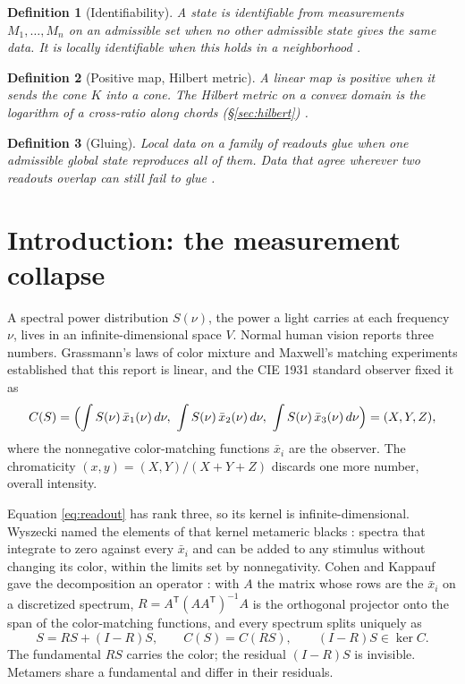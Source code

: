 \documentclass[11pt]{article}
\theoremstyle{boldplain}
\theoremstyle{boldupright}
\newtheorem{definition}{Definition}
\begin{document}
\begin{definition}[Identifiability]
A state is identifiable from measurements $M_1,\dots,M_n$ on an admissible set when no other admissible state gives the same data. It is locally identifiable when this
holds in a neighborhood \cite{rothenberg1971}.
\end{definition}

\begin{definition}[Positive map, Hilbert metric]
A linear map is positive when it sends the cone $K$
into a cone. The Hilbert metric on a convex domain is the logarithm of a cross-ratio along chords
(\S\ref{sec:hilbert}) \cite{hilbert1895}.
\end{definition}

\begin{definition}[Gluing]\label{def:glue}
Local data on a family of readouts glue when one admissible global state reproduces all of them.
Data that agree wherever two readouts overlap can still fail to glue \cite{abramsky2011}.
\end{definition}

\section{Introduction: the measurement collapse}\label{sec:intro}

A spectral power distribution $S(\nu)$, the power a light carries at each frequency $\nu$, lives in an
infinite-dimensional space $V$. Normal human vision reports three numbers. Grassmann's laws of
color mixture \cite{grassmann1853} and Maxwell's matching experiments \cite{maxwell1860} established that this report is linear, and
the CIE 1931 standard observer \cite{smith1931} fixed it as
\begin{equation}\label{eq:readout}
C(S)=\Bigl(\int S(\nu)\,\bar x_1(\nu)\,d\nu,\ \int S(\nu)\,\bar x_2(\nu)\,d\nu,\ \int S(\nu)\,\bar x_3(\nu)\,d\nu\Bigr)=(X,Y,Z),
\end{equation}
where the nonnegative color-matching functions $\bar x_i$ are the observer. The chromaticity $(x,y)=
(X,Y)/(X+Y+Z)$ discards one more number, overall intensity.

Equation \eqref{eq:readout} has rank three, so its kernel is infinite-dimensional. Wyszecki named the elements
of that kernel metameric blacks \cite{wyszecki1958}: spectra that integrate to zero against every $\bar x_i$ and can be
added to any stimulus without changing its color, within the limits set by nonnegativity. Cohen
and Kappauf gave the decomposition an operator \cite{cohen1982}: with $A$ the matrix whose rows are the $\bar x_i$
on a discretized spectrum, $R=A^{\mathsf T}(AA^{\mathsf T})^{-1}A$ is the orthogonal projector onto the span of the
color-matching functions, and every spectrum splits uniquely as
\begin{equation}\label{eq:cohen}
S=RS+(I-R)S,\qquad C(S)=C(RS),\qquad (I-R)S\in\ker C.
\end{equation}
The fundamental $RS$ carries the color; the residual $(I-R)S$ is invisible. Metamers share a
fundamental and differ in their residuals.
\end{document}
